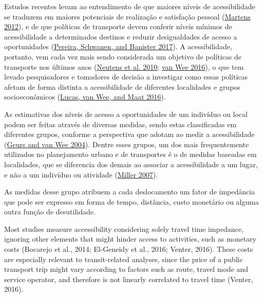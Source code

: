 \documentclass[msc,numbers]{coppe}
\begin{document}
  Estudos recentes levam ao entendimento de que maiores níveis de acessibilidade se traduzem em maiores potenciais de realização e satisfação pessoal (\protect\hyperlink{ref-martens2012justice}{Martens 2012}), e de que políticas de transporte devem conferir níveis mínimos de acessibilidade a determinados destinos e reduzir desigualdades de acesso a oportunidades (\protect\hyperlink{ref-pereira2017distributive}{Pereira, Schwanen, and Banister 2017}). A acessibilidade, portanto, vem cada vez mais sendo considerada um objetivo de políticas de transporte nos últimos anos (\protect\hyperlink{ref-neutens2010equity}{Neutens et al. 2010}; \protect\hyperlink{ref-vanwee2016accessible}{van Wee 2016}), o que tem levado pesquisadores e tomadores de decisão a investigar como essas políticas afetam de forma distinta a acessibilidade de diferentes localidades e grupos socioeconômicos (\protect\hyperlink{ref-lucas2016method}{Lucas, van Wee, and Maat 2016}).

  As estimativas dos níveis de acesso a oportunidades de um indivíduo ou local podem ser feitas através de diversas medidas, sendo estas classificadas em diferentes grupos, conforme a perspectiva que adotam ao medir a acessibilidade (\protect\hyperlink{ref-geurs2004accessibility}{Geurs and van Wee 2004}). Dentre esses grupos, um dos mais frequentemente utilizados no planejamento urbano e de transportes é o de medidas baseadas em localidades, que se diferencia dos demais ao associar a acessibilidade a um lugar, e não a um indivíduo ou atividade (\protect\hyperlink{ref-miller2007placebased}{Miller 2007}).

  As medidas desse grupo atribuem a cada deslocamento um fator de impedância que pode ser expresso em forma de tempo, distância, custo monetário ou alguma outra função de desutilidade.

  Most studies measure accessibility considering solely travel time impedance, ignoring other elements that might hinder access to activities, such as monetary costs (Bocarejo et al., 2014; El-Geneidy et al., 2016; Venter, 2016). These costs are especially relevant to transit-related analyses, since the price of a public transport trip might vary according to factors such as route, travel mode and service operator, and therefore is not linearly correlated to travel time (Venter, 2016).
\end{document}

